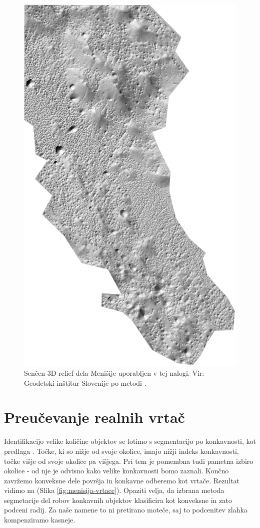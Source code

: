 \documentclass[a4paper, oneside, 12pt]{book}
\begin{document}
        \begin{figure}[H]
          \begin{center}
            \includegraphics[width=12cm]{slike/menisija-relief}
          \end{center}
          \caption{Senčen 3D relief dela Menišije uporabljen v tej nalogi. Vir: Geodetski inštitur Slovenije \cite{LAK} po metodi \cite{Kobler20079}.}
          \label{fig:menisija-relief}
        \end{figure}

        \chapter{Preučevanje realnih vrtač}
        \label{realne-vrtace}
        Identifikacijo velike količine objektov se lotimo s segmentacijo po konkavnosti, kot predlaga \cite{doctor13}. Točke, ki so nižje od svoje okolice, imajo nižji indeks konkavnosti, točke višje od svoje okolice pa višjega. Pri tem je pomembna tudi pametna izbiro okolice - od nje je odvisno kako velike konkavnosti bomo zaznali. Končno zavržemo konveksne dele površja in konkavne odberemo kot vrtače. Rezultat vidimo na (Slika \ref{fig:menisija-vrtace}). Opaziti velja, da izbrana metoda segmetacije del robov konkavnih objektov klasificira kot konveksne in zato podceni radij. Za naše namene to ni pretirano moteče, saj to podcenitev zlahka kompenziramo kasneje.
\end{document}
